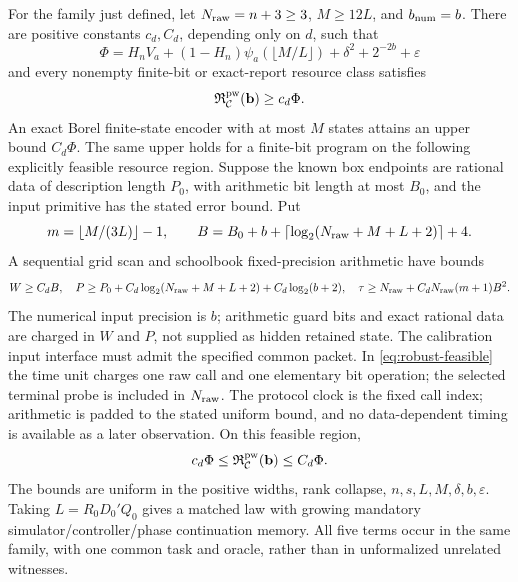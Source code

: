 \begin{theorem}\label{thm:robust}
For the family just defined, let $N_{\rm raw}=n+3\ge3$, $M\ge12L$, and $b_{\rm num}=b$. There are positive constants $c_d,C_d$, depending only on $d$, such that
\begin{equation}\label{eq:robust-phi}
 \Phi=H_nV_a+(1-H_n)\psi_a(\lfloor M/L\rfloor)
                  +\delta^2+2^{-2b}+\varepsilon
\end{equation}
and every nonempty finite-bit or exact-report resource class satisfies
\begin{equation}\label{eq:robust-lower}
 \mathfrak R_{\mathcal C}^{\rm pw}(\mathbf b)\ge c_d\Phi.
\end{equation}
An exact Borel finite-state encoder with at most $M$ states attains an upper bound $C_d\Phi$. The same upper holds for a finite-bit program on the following explicitly feasible resource region. Suppose the known box endpoints are rational data of description length $P_0$, with arithmetic bit length at most $B_0$, and the input primitive has the stated error bound. Put
\[
 m=\lfloor M/(3L)\rfloor-1,\qquad
 B=B_0+b+\lceil\log_2(N_{\rm raw}+M+L+2)\rceil+4.
\]
A sequential grid scan and schoolbook fixed-precision arithmetic have bounds
\begin{equation}\label{eq:robust-feasible}
 W\ge C_dB,\quad P\ge P_0+C_d\log_2(N_{\rm raw}+M+L+2)+C_d\log_2(b+2),
 \quad \tau\ge N_{\rm raw}+C_dN_{\rm raw}(m+1)B^2.
\end{equation}
The numerical input precision is $b$; arithmetic guard bits and exact rational data are charged in $W$ and $P$, not supplied as hidden retained state. The calibration input interface must admit the specified common packet. In \eqref{eq:robust-feasible} the time unit charges one raw call and one elementary bit operation; the selected terminal probe is included in $N_{\rm raw}$. The protocol clock is the fixed call index; arithmetic is padded to the stated uniform bound, and no data-dependent timing is available as a later observation. On this feasible region,
\begin{equation}\label{eq:robust-match}
 c_d\Phi\le\mathfrak R_{\mathcal C}^{\rm pw}(\mathbf b)\le C_d\Phi.
\end{equation}
The bounds are uniform in the positive widths, rank collapse, $n,s,L,M,\delta,b,\varepsilon$. Taking $L=R_0D_0'Q_0$ gives a matched law with growing mandatory simulator/controller/phase continuation memory. All five terms occur in the same family, with one common task and oracle, rather than in unformalized unrelated witnesses.
\end{theorem}
